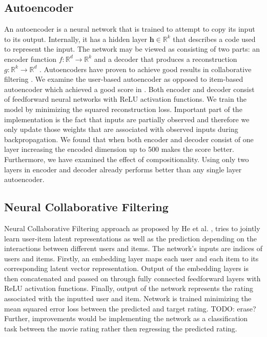 \documentclass[10pt,conference,compsocconf]{IEEEtran}
\begin{document}
    \subsection{Autoencoder}
    An autoencoder is a neural network that is trained to attempt to copy its input to its output.
    Internally, it has a hidden layer $\textbf{h} \in \mathbb{R}^k$ that describes a code used to represent the input.
    The network may be viewed as consisting of two parts: an encoder function $f: \mathbb{R} ^d \rightarrow \mathbb{R} ^k$ and a
    decoder that produces a reconstruction $g: \mathbb{R} ^k \rightarrow \mathbb{R} ^d$ \cite{Goodfellow-et-al-2016}. Autoencoders
    have proven to achieve good results in collaborative filtering \cite{inproceedings}. We examine the user-based
    autoencoder as opposed to item-based autoencoder which achieved a good score in \cite{inproceedings}. Both encoder
    and decoder consist of feedforward neural networks with ReLU activation functions. We train the model by minimizing
    the squared reconstruction loss. Important part of the implementation is the fact that inputs are partially observed
    and therefore we only update those weights that are associated with observed inputs during backpropagation.
    We found that when both encoder and decoder consist of one layer increasing the encoded dimension up to 500 makes
    the score better. Furthermore, we have examined the effect of compositionality. Using only two layers in encoder
    and decoder already performs better than any single layer autoencoder.

    \subsection{Neural Collaborative Filtering}
    Neural Collaborative Filtering approach as proposed by He et al. \cite{DBLP:journals/corr/abs-1708-05031}, tries to
    jointly learn user-item latent representations as well as the prediction depending on the interactions between
    different users and items. The network's inputs are indices of users and items. Firstly, an embedding layer maps
    each user and each item to its corresponding latent vector representation. Output of the embedding layers is then
    concatenated and passed on through fully connected feedforward layers with ReLU activation functions. Finally,
    output of the network represents the rating associated with the inputted user and item. Network is trained minimizing
    the mean squared error loss between the predicted and target rating. TODO: erase? Further, improvements would be
    implementing the network as a classification task between the movie rating rather then regressing the predicted rating.
\end{document}
